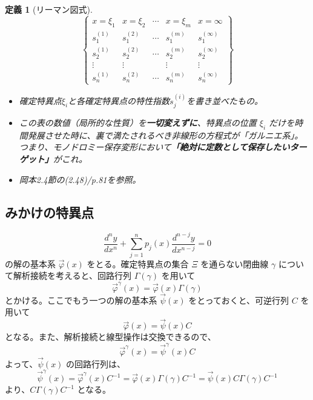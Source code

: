\documentclass[paper=a4, fontsize=11pt]{jlreq} %
\theoremstyle{break}
\newtheorem{definition}[theorem]{定義}
\theoremstyle{qa}
\theoremstyle{remark} %
\begin{document}


\begin{definition}[リーマン図式]%
    \[
    \left\{
    \begin{matrix}
        x = \xi_1 & x = \xi_2 & \cdots & x = \xi_m & x = \infty \\
        s_1^{(1)} & s_1^{(2)} & \cdots & s_1^{(m)} & s_1^{(\infty)} \\
        s_2^{(1)} & s_2^{(2)} & \cdots & s_2^{(m)} & s_2^{(\infty)} \\
        \vdots    & \vdots    &        & \vdots    & \vdots \\
        s_n^{(1)} & s_n^{(2)} & \cdots & s_n^{(m)} & s_n^{(\infty)}
    \end{matrix}
    \right\}
    \]
    \begin{itemize}
        \item[\textbf{Type:}] 確定特異点$\xi_{i}$と各確定特異点の特性指数$s_j^{(i)}$を書き並べたもの。
        \item[\textbf{Insight:}] この表の数値（局所的な性質）を\textbf{一切変えずに}、特異点の位置 $\xi_i$ だけを時間発展させた時に、裏で満たされるべき非線形の方程式が「ガルニエ系」。つまり、モノドロミー保存変形において\textbf{「絶対に定数として保存したいターゲット」}がこれ。
        \item[\textbf{Link:}] 岡本2.4節の(2.48)/p.81を参照。
    \end{itemize}
\end{definition}

\subsection{みかけの特異点}

\begin{equation}\label{eq:fuchs_n_order}
    \frac{d^{n}y}{dx^{n}}+\sum_{j=1}^{n} p_{j}(x)\frac{d^{n-j}y}{dx^{n-j}} = 0   
\end{equation}
の解の基本系 $\vec{\varphi}(x)$ をとる。確定特異点の集合 $\Xi$ を通らない閉曲線 $\gamma$ について解析接続を考えると、回路行列 $\Gamma(\gamma)$ を用いて
\[
\vec{\varphi}^{\gamma}(x) = \vec{\varphi}(x)\Gamma(\gamma)
\]
とかける。ここでもう一つの解の基本系 $\vec{\psi}(x)$ をとっておくと、可逆行列 $C$ を用いて
\[
\vec{\varphi}(x) = \vec{\psi}(x)C
\]
となる。また、解析接続と線型操作は交換できるので、
\[
\vec{\varphi}^{\gamma}(x) = \vec{\psi}^{\gamma}(x)C
\]
よって、$\vec{\psi}(x)$ の回路行列は、
\[
\vec{\psi}^{\gamma}(x) = \vec{\varphi}^{\gamma}(x)C^{-1} = \vec{\varphi}(x)\Gamma(\gamma)C^{-1} = \vec{\psi}(x)C\Gamma(\gamma)C^{-1}
\]
より、$C\Gamma(\gamma)C^{-1}$ となる。
\end{document}
